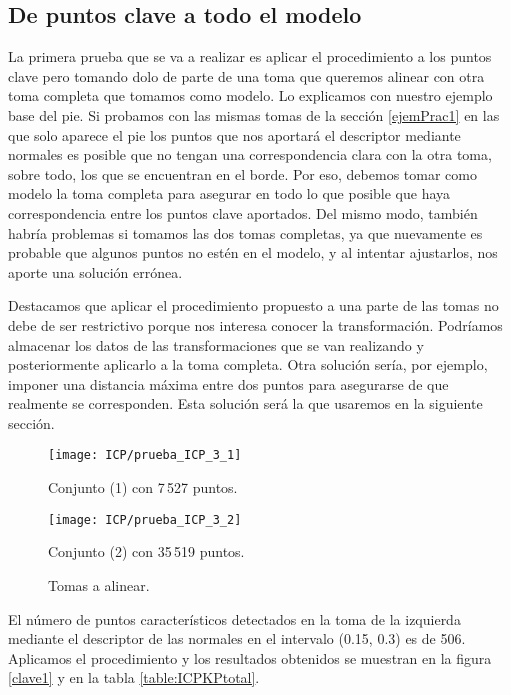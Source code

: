 \subsection{De puntos clave a todo el modelo}
La primera prueba que se va a realizar es aplicar el procedimiento a los puntos clave pero tomando dolo de parte de una toma que queremos alinear con otra toma completa que tomamos como modelo. Lo explicamos con nuestro ejemplo base del pie. Si probamos con las mismas tomas de la sección \ref{ejemPrac1} en las que solo aparece el pie los puntos que nos aportará el descriptor mediante normales es posible que no tengan una correspondencia clara con la otra toma, sobre todo, los que se encuentran en el borde. Por eso, debemos tomar como modelo la toma completa para asegurar en todo lo que posible que haya correspondencia entre los puntos clave aportados. Del mismo modo, también habría problemas si tomamos las dos tomas completas, ya que nuevamente es probable que algunos puntos no estén en el modelo, y al intentar ajustarlos, nos aporte una solución errónea. \begin{comment}
Sección sola de aproximaciones erróneas
\end{comment} 
Destacamos que aplicar el procedimiento propuesto a una parte de las tomas no debe de ser restrictivo porque nos interesa conocer la transformación. Podríamos almacenar los datos de las transformaciones que se van realizando y posteriormente aplicarlo a la toma completa. Otra solución sería, por ejemplo, imponer una distancia máxima entre dos puntos para asegurarse de que realmente se corresponden. Esta solución será la que usaremos en la siguiente sección.\\

\begin{figure}[h!]

	\begin{minipage}[b]{0.5\textwidth}
		\centering
		\texttt{[image: ICP/prueba\_ICP\_3\_1]} 
		\caption*{Conjunto (1) con  7\,527 puntos.}
	\end{minipage}
	\begin{minipage}[b]{0.5\textwidth}
		\centering
		\texttt{[image: ICP/prueba\_ICP\_3\_2]}
		\caption*{Conjunto (2) con 35\,519 puntos.}
	\end{minipage}
	
	\caption{Tomas a alinear.}
\end{figure}

El número de puntos característicos detectados en la toma de la izquierda mediante el descriptor de las normales en el intervalo (0.15, 0.3) es de 506. Aplicamos el procedimiento y los resultados obtenidos se muestran en la figura \ref{clave1} y en la tabla \ref{table:ICPKPtotal}.\\


